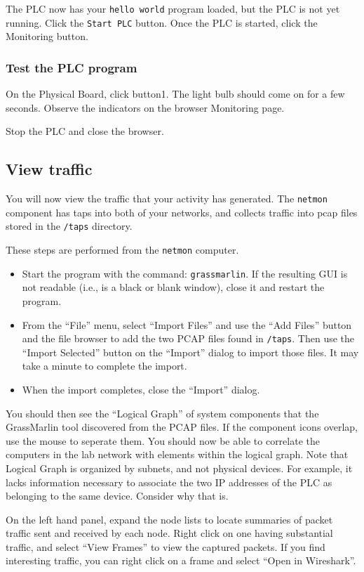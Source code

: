 The PLC now has your {\tt hello world} program loaded, but the PLC is not yet running.
Click the {\tt Start PLC} button.  Once the PLC is started, click the Monitoring button.

\subsubsection{Test the PLC program}
On the Physical Board, click button1.  The light bulb should come on for a few seconds.  Observe the indicators on the browser
Monitoring page.  

Stop the PLC and close the browser.

\subsection{View traffic}
You will now view the traffic that your activity has generated.  The {\tt netmon} component has taps into both of your networks, and collects 
traffic into pcap files stored in the {\tt /taps} directory.  

These steps are performed from the {\tt netmon} computer.
\begin{itemize}
\item Start the program with the command: {\tt grassmarlin}.  If the resulting GUI is not readable 
(i.e., is a black or blank window), close it and restart the program.
\item From the ``File'' menu, select ``Import Files'' and use the ``Add Files'' button and the file
browser to add the two PCAP files found in {\tt /taps}.  Then use the ``Import Selected'' button
on the ``Import'' dialog to import those files.  It may take a minute to complete the import.  
\item When the import completes, close the ``Import'' dialog.
\end{itemize}
You should then see the ``Logical Graph'' of system components that the GrassMarlin tool discovered from the
PCAP files.   If the component icons overlap, use the mouse to seperate them.  You should now be able to correlate 
the computers in the lab network with elements within the logical graph.  Note that Logical Graph is organized by 
subnets,  and not physical devices.   For example, it lacks information necessary to associate the two IP addresses of the
PLC as belonging to the same device.  Consider why that is.

On the left hand panel, expand the node lists to locate summaries of packet traffic sent and received by
each node.  Right click on one having substantial traffic, and select ``View Frames'' to view the captured packets.
If you find interesting traffic, you can right click on a frame and select ``Open in Wireshark''.

